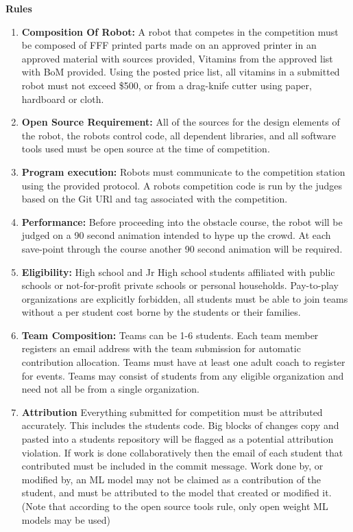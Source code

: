 \documentclass{article}
\begin{document}
  \pagebreak
{\huge \textbf{Rules}}

\begin{enumerate}
	
\item \textbf{Composition Of Robot:} A robot that competes in the competition must be composed of FFF printed parts made on an approved printer in an approved material with sources provided, Vitamins from the approved list with BoM provided. Using the posted price list, all vitamins in a submitted robot must not exceed \$500, or from a drag-knife cutter using paper, hardboard or cloth. 

\item \textbf{Open Source Requirement:} All of the sources for the design elements of the robot, the robots control code, all dependent libraries, and all software tools used must be open source at the time of competition. 

\item \textbf{Program execution:} Robots must communicate to the competition station using the provided protocol. A robots competition code is run by the judges based on the Git URl and tag associated with the competition. 


\item \textbf{Performance:} Before proceeding into the obstacle course, the robot will be judged on a 90 second animation intended to hype up the crowd. At each save-point through the course another 90 second animation will be required. 

\item \textbf{Eligibility:} High school and Jr High school students affiliated with public schools or not-for-profit private schools or personal households. Pay-to-play organizations are explicitly forbidden, all students must be able to join teams without a per student cost borne by the students or their families. 


\item \textbf{Team Composition:} Teams can be 1-6 students. Each team member registers an email address with the team submission for automatic contribution allocation. Teams must have at least one adult coach to register for events. Teams may consist of students from any eligible organization and need not all be from a single organization.  

 
\item \textbf{Attribution} Everything submitted for competition must be attributed accurately. This includes the students code. Big blocks of changes copy and pasted into a students repository will be flagged as a potential attribution violation. If work is done collaboratively then the email of each student that contributed must be included in the commit message. Work done by, or modified by, an ML model may not be claimed as a contribution of the student, and must be attributed to the model that created or modified it. (Note that according to the open source tools rule, only open weight ML models may be used)




\end{enumerate}
\end{document}
